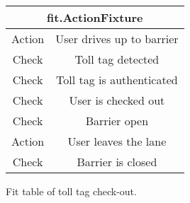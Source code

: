 \begin{figure}[H]
\begin{centering}
\begin{tabular}{|c|c|}
\hline 
\multicolumn{2}{|c|}{fit.ActionFixture}\tabularnewline
\hline 
Action & User drives up to barrier\tabularnewline
\hline 
Check & Toll tag detected\tabularnewline
\hline 
Check & Toll tag is authenticated\tabularnewline
\hline 
Check & User is checked out\tabularnewline
\hline 
Check & Barrier open\tabularnewline
\hline 
Action & User leaves the lane\tabularnewline
\hline 
Check & Barrier is closed\tabularnewline
\hline 
\end{tabular}
\caption{Fit table of toll tag check-out.}
\end{centering}
\end{figure}
